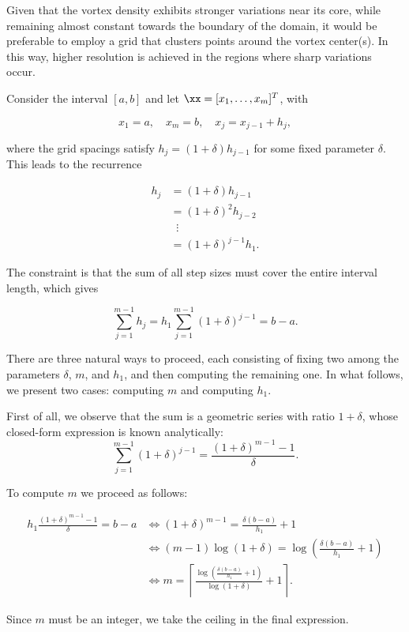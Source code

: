 Given that the vortex density exhibits stronger variations near its core, while remaining almost constant towards the boundary of the domain, it would be preferable to employ a grid that clusters points around the vortex center(s). 
In this way, higher resolution is achieved in the regions where sharp variations occur.

Consider the interval $[a,b]$ and let $\xx = [x_1, \dots, x_m]^T$, with 

\[
    x_1 = a, \quad x_m = b, \quad x_j = x_{j-1} + h_j,
\]

where the grid spacings satisfy $h_j = (1 + \delta) h_{j-1}$ for some fixed parameter $\delta$.  
This leads to the recurrence

\begin{align*}
    h_j &= (1 + \delta) h_{j-1} \\
        &= (1 + \delta)^2 h_{j-2} \\
        &\;\;\vdots \\
        &= (1 + \delta)^{j-1} h_1.
\end{align*}

The constraint is that the sum of all step sizes must cover the entire interval length, which gives

\[
    \sum_{j=1}^{m-1} h_j
    = h_1 \sum_{j=1}^{m-1} (1+\delta)^{j-1} 
    = b-a.
\]

There are three natural ways to proceed, each consisting of fixing two among the parameters $\delta$, $m$, and $h_1$, and then computing the remaining one.  
In what follows, we present two cases: computing $m$ and computing $h_1$.

First of all, we observe that the sum is a geometric series with ratio $1+\delta$, whose closed-form expression is known analytically:  
\[
    \sum_{j=1}^{m-1} (1+\delta)^{j-1} = \frac{(1+\delta)^{m-1} - 1}{\delta}.
\]

To compute $m$ we proceed as follows:

\begin{align*}
    h_1 \frac{(1+\delta)^{m-1} - 1}{\delta} = b-a 
    &\iff (1+\delta)^{m-1} = \frac{\delta(b-a)}{h_1} + 1 \\
    &\iff (m-1)\log(1+\delta) = \log\!\left(\frac{\delta(b-a)}{h_1} + 1\right) \\
    &\iff m = \left\lceil \frac{\log\!\left(\tfrac{\delta(b-a)}{h_1} + 1\right)}{\log(1+\delta)} + 1 \right\rceil.
\end{align*}

Since $m$ must be an integer, we take the ceiling in the final expression.

